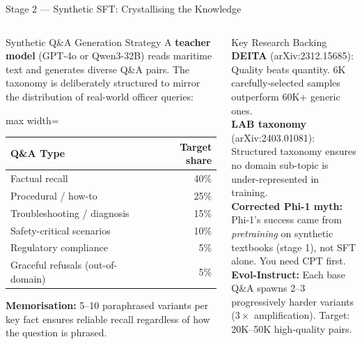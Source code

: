 \documentclass[aspectratio=169,11pt]{beamer}
\begin{document}
\begin{frame}[shrink=18]{Stage 2 --- Synthetic SFT: Crystallising the Knowledge}
\begin{columns}[T]

\begin{block}{Synthetic Q\&A Generation Strategy}
  \RaggedRight
  A \textbf{teacher model} (GPT-4o or Qwen3-32B) reads maritime
  text and generates diverse Q\&A pairs. The taxonomy is deliberately
  structured to mirror the distribution of real-world officer queries:
  \vspace{3pt}
  \begin{adjustbox}{max width=\linewidth}
  \begin{tabular}{@{}lr@{}}
    \toprule
    \textbf{Q\&A Type} & \textbf{Target share}\\
    \midrule
    Factual recall & 40\%\\
    Procedural / how-to & 25\%\\
    Troubleshooting / diagnosis & 15\%\\
    Safety-critical scenarios & 10\%\\
    Regulatory compliance & 5\%\\
    Graceful refusals (out-of-domain) & 5\%\\
    \bottomrule
  \end{tabular}
  \end{adjustbox}
  \vspace{3pt}
  \textbf{Memorisation:} 5--10 paraphrased variants per key fact
  ensures reliable recall regardless of how the question is phrased.
\end{block}


\begin{block}{Key Research Backing}
  \scriptsize\RaggedRight
  \textbf{DEITA} (arXiv:2312.15685): Quality beats quantity.
  6K carefully-selected samples outperform 60K+ generic ones.\\[3pt]
  \textbf{LAB taxonomy} (arXiv:2403.01081): Structured taxonomy
  ensures no domain sub-topic is under-represented in training.\\[3pt]
  \textbf{Corrected Phi-1 myth:} Phi-1's success came from
  \emph{pretraining} on synthetic textbooks (stage 1), not SFT alone.
  You need CPT first.\\[3pt]
  \textbf{Evol-Instruct:} Each base Q\&A spawns 2--3 progressively
  harder variants ($3\times$ amplification).
  Target: 20K--50K high-quality pairs.
\end{block}


\end{columns}
\end{frame}
\end{document}
